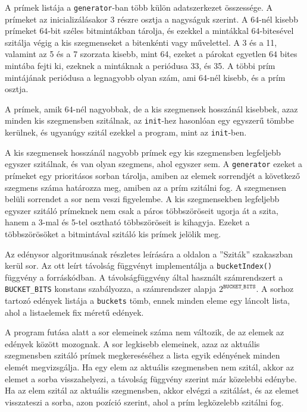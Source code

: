 A prímek listája a \texttt{generator}-ban több külön adatszerkezet összessége.
A prímeket az inicializálásakor 3 részre osztja a nagyságuk szerint.
A $64$-nél kisebb prímeket $64$-bit széles bitmintákban tárolja, és ezekkel a mintákkal $64$-bitesével szitálja végig a kis szegmenseket a bitenkénti vagy művelettel.
A 3 és a 11, valamint az 5 és a 7 szorzata kisebb, mint 64, ezeket a párokat egyetlen $64$ bites mintába fejti ki, ezeknek a mintáknak a periódusa 33, és 35.
A többi prím mintájának periódusa a legnagyobb olyan szám, ami 64-nél kisebb, és a prím osztja.

A prímek, amik $64$-nél nagyobbak, de a kis szegmensek hosszánál kisebbek, azaz minden kis szegmensben szitálnak, az \texttt{init}-hez hasonlóan egy egyszerű tömbbe kerülnek, és ugyanúgy szitál ezekkel a program, mint az \texttt{init}-ben.

A kis szegmensek hosszánál nagyobb prímek egy kis szegmensben legfeljebb egyszer szitálnak, és van olyan szegmens, ahol egyszer sem.
A \texttt{generator} ezeket a prímeket egy prioritásos sorban tárolja, amiben az elemek sorrendjét a következő szegmens száma határozza meg, amiben az a prím szitálni fog.
A szegmensen belüli sorrendet a sor nem veszi figyelembe.
A kis szegmensekben legfeljebb egyszer szitáló prímeknek nem csak a páros többszöröseit ugorja át a szita, hanem a 3-mal és 5-tel osztható többszöröseit is kihagyja.
Ezeket a többszörösöket a bitmintával szitáló kis prímek jelölik meg.

Az edénysor algoritmusának részletes leírására a \pageref{sec:szitak} oldalon a ''Sziták'' szakaszban kerül sor.
Az ott leírt távolság függvényt implementálja a \texttt{bucketIndex()} függvény a forráskódban.
A távolságfüggvény által használt számrendszert a \texttt{BUCKET\_BITS} konstans szabályozza,
a számrendszer alapja $2^{\texttt{BUCKET\_BITS}}$.
A sorhoz tartozó edények listája a \texttt{buckets} tömb, ennek minden eleme egy láncolt lista, ahol a listaelemek fix méretű edények.

A program futása alatt a sor elemeinek száma nem változik, de az elemek az edények között mozognak.
A sor legkisebb elemeinek, azaz az aktuális szegmensben szitáló prímek megkereséséhez a lista egyik edényének minden elemét megvizsgálja.
Ha egy elem az aktuális szegmensben nem szitál, akkor az elemet a sorba visszahelyezi, a távolság függvény szerint már közelebbi edénybe.
Ha az elem szitál az aktuális szegmensben, akkor elvégzi a szitálást, és az elemet visszateszi a sorba, azon pozíció szerint, ahol a prím legközelebb szitálni fog.

